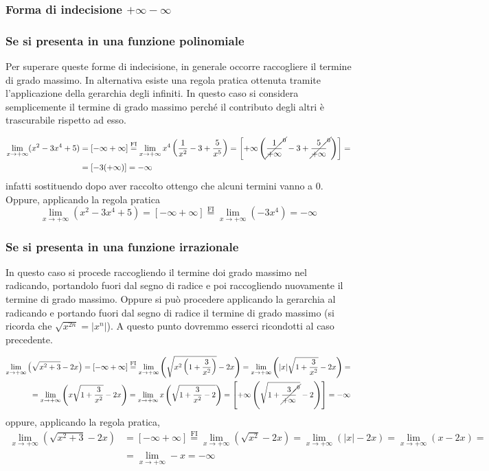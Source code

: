 \subsubsection{Forma di indecisione $+\infty-\infty$}
\subsubsection{Se si presenta in una funzione polinomiale}
Per superare queste forme di indecisione, in generale occorre raccogliere il termine di grado massimo. In alternativa esiste una regola pratica ottenuta tramite l'applicazione della gerarchia degli infiniti. In questo caso si considera semplicemente il termine di grado massimo perché il contributo degli altri è trascurabile rispetto ad esso.
\begin{ex}
\[\begin{aligned}\lim_{x\to +\infty}(x^2-3x^4+5)&=[-\infty+\infty]\overset{\mathrm{FI}}{=}\lim_{x\to +\infty}x^4\left( {\frac{1}{x^2}} -3+\frac{5}{x^5}\right)=\left[ +\infty \left( \cancel{\frac{1}{+\infty}^0}-3+\cancel{\frac{5}{+\infty}^0 }\right) \right]=\\&=[-3(+\infty)]=-\infty\end{aligned}\]
infatti sostituendo dopo aver raccolto ottengo che alcuni termini vanno a 0. Oppure, applicando la regola pratica
\[\lim_{x\to +\infty}(x^2-3x^4+5)=[-\infty+\infty]\overset{\mathrm{FI}}{=}\lim_{x\to +\infty}(-3x^4)=-\infty\]
\end{ex}
\subsubsection{Se si presenta in una funzione irrazionale}
In questo caso si procede raccogliendo il termine doi grado massimo nel radicando, portandolo fuori dal segno di radice e poi raccogliendo nuovamente il termine di grado massimo. Oppure si può procedere applicando la gerarchia al radicando e portando fuori dal segno di radice il termine di grado massimo (si ricorda che $\sqrt{x^{2n}}=|x^n|$). A questo punto dovremmo esserci ricondotti al caso precedente. 
\begin{ex}
\[\begin{aligned}\lim_{x\to +\infty}\left(\sqrt{x^2+3}-2x\right)=[-\infty+\infty]\overset{\mathrm{FI}}{=}\lim_{x\to +\infty}\left(\sqrt{x^2\left( 1+\frac{3}{x^2} \right)}-2x\right)=\lim_{x\to +\infty}\left(|x|\sqrt{1+\frac{3}{x^2}}-2x\right) =\\= \lim_{x\to +\infty}\left(x\sqrt{1+\frac{3}{x^2}}-2x\right) =\lim_{x\to +\infty}x\left( \sqrt{1+\frac{3}{x^2}-2} \right)=\left[ +\infty\left(\sqrt{1+\cancel{\frac{3}{+\infty}^0}} -2\right)\right]=-\infty\end{aligned}\]
oppure, applicando la regola pratica,
\[\begin{aligned}\lim_{x\to +\infty}\left(\sqrt{x^2+3}-2x\right)&=[-\infty+\infty]\overset{\mathrm{FI}}{=}\lim_{x\to +\infty}\left(\sqrt{x^2}-2x\right)=\lim_{x\to +\infty}(|x|-2x) = \lim_{x\to +\infty}(x-2x) = \\&=\lim_{x\to +\infty}-x=-\infty\end{aligned}\]
\end{ex}

